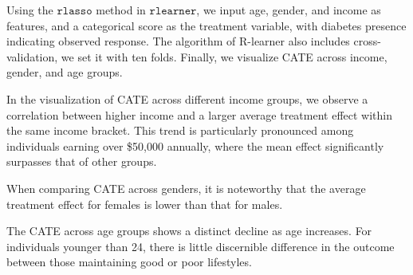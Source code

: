 \documentclass[
  12pt,
]{article}
\begin{document}
Using the \(\texttt{rlasso}\) method in \(\texttt{rlearner}\), we input
age, gender, and income as features, and a categorical score as the
treatment variable, with diabetes presence indicating observed response.
The algorithm of R-learner also includes cross-validation, we set it
with ten folds. Finally, we visualize CATE across income, gender, and
age groups.

In the visualization of CATE across different income groups, we observe
a correlation between higher income and a larger average treatment
effect within the same income bracket. This trend is particularly
pronounced among individuals earning over \$50,000 annually, where the
mean effect significantly surpasses that of other groups.

When comparing CATE across genders, it is noteworthy that the average
treatment effect for females is lower than that for males.

The CATE across age groups shows a distinct decline as age increases.
For individuals younger than 24, there is little discernible difference
in the outcome between those maintaining good or poor lifestyles.
\end{document}
